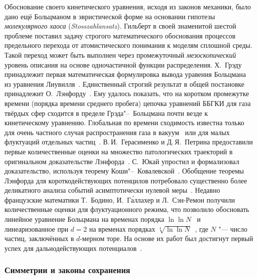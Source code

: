 Обоснование своего кинетического уравнения, исходя из законов механики, было дано ещё Больцманом в эвристической форме
на основании гипотезы \emph{молекулярного хаоса} (\emph{Stosszahlansatz}).
Гильберт в своей знаменитой шестой проблеме поставил задачу строгого математического обоснования
процессов предельного перехода от атомистического понимания к моделям сплошной среды.
Такой переход может быть выполнен через промежуточный \emph{мезоскопический} уровень описания
на основе одночастичной функции распределения.
Х.~Грэду принадлежит первая математическая формулировка вывода уравения Больцмана из уравнения Лиувилля~\cite{Grad1949}.
Единственный строгий результат в общей постановке принадлежит О.~Лэнфорду~\cite{Lanford1975}.
Ему удалось показать, что на коротком промежутке времени (порядка времени среднего пробега)
цепочка уравнений ББГКИ для газа твёрдых сфер сходится в пределе Грэда"--~Больцмана почти везде к кинетическому уравнению.
Глобальная по времени сходимость известна только для очень частного случая распространения газа в вакуум~\cite{Illner1989}
или для малых флуктуаций отдельных частиц~\cite{Beijeren1980}.
В.\,И.~Герасименко и Д.\,Я.~Петрина предоставили первые количественные оценки на множество патологических
траекторий в оригинальном доказательстве Лэнфорда~\cite{Petrina1990}.
С.~Юкай упростил и формализовал доказательство, используя теорему Коши"--~Ковалевской~\cite{Ukai2001}.
Обобщение теоремы Лэнфорда для короткодействующих потенцилов потребовало существенно более деликатного
анализа событий асимптотически нулевой меры~\cite{Raymond2013, Pulvirenti2014}.
Недавно французские математики Т.~Бодино, И.~Г\'{а}ллахер и Л.~Сэн-Ремон получили количественные оценки для флуктуационного режима,
что позволило обосновать линейное уравнение Больцмана на временах порядка \(\ln\ln{N}\)~\cite{Raymond2016}
и линеаризованное при \(d=2\) на временах порядках \(\sqrt[4]{\ln\ln{N}}\)~\cite{Raymond2017},
где \(N\) "--- число частиц, заключённых в \(d\)-мерном торе.
На основе их работ был достигнут первый успех для дальнодействующих потенциалов~\cite{Ayi2017}.

\subsubsection{Симметрии и законы сохранения}

